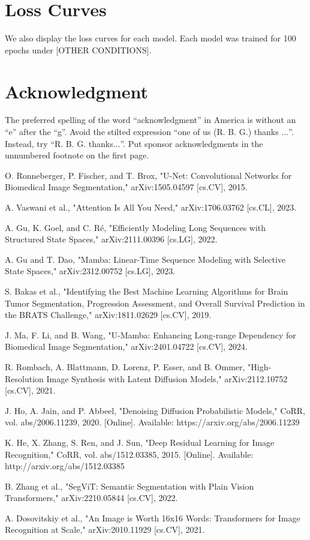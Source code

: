 \documentclass[conference]{IEEEtran}
\begin{document}
\section{Loss Curves}
We also display the loss curves for each model. Each model was trained for 100 epochs under [OTHER CONDITIONS].

\section*{Acknowledgment}

The preferred spelling of the word ``acknowledgment'' in America is without 
an ``e'' after the ``g''. Avoid the stilted expression ``one of us (R. B. 
G.) thanks $\ldots$''. Instead, try ``R. B. G. thanks$\ldots$''. Put sponsor 
acknowledgments in the unnumbered footnote on the first page.

\begin{thebibliography}{00}
 O. Ronneberger, P. Fischer, and T. Brox, "U-Net: Convolutional Networks for Biomedical Image Segmentation," arXiv:1505.04597 [cs.CV], 2015.

 A. Vaswani et al., "Attention Is All You Need," arXiv:1706.03762 [cs.CL], 2023.

 A. Gu, K. Goel, and C. Ré, "Efficiently Modeling Long Sequences with Structured State Spaces," arXiv:2111.00396 [cs.LG], 2022.

 A. Gu and T. Dao, "Mamba: Linear-Time Sequence Modeling with Selective State Spaces," arXiv:2312.00752 [cs.LG], 2023.

 S. Bakas et al., "Identifying the Best Machine Learning Algorithms for Brain Tumor Segmentation, Progression Assessment, and Overall Survival Prediction in the BRATS Challenge," arXiv:1811.02629 [cs.CV], 2019.

 J. Ma, F. Li, and B. Wang, "U-Mamba: Enhancing Long-range Dependency for Biomedical Image Segmentation," arXiv:2401.04722 [cs.CV], 2024.

 R. Rombach, A. Blattmann, D. Lorenz, P. Esser, and B. Ommer, "High-Resolution Image Synthesis with Latent Diffusion Models," arXiv:2112.10752 [cs.CV], 2021.

 J. Ho, A. Jain, and P. Abbeel, "Denoising Diffusion Probabilistic Models," CoRR, vol. abs/2006.11239, 2020. [Online]. Available: https://arxiv.org/abs/2006.11239

 K. He, X. Zhang, S. Ren, and J. Sun, "Deep Residual Learning for Image Recognition," CoRR, vol. abs/1512.03385, 2015. [Online]. Available: http://arxiv.org/abs/1512.03385

 B. Zhang et al., "SegViT: Semantic Segmentation with Plain Vision Transformers," arXiv:2210.05844 [cs.CV], 2022.

 A. Dosovitskiy et al., "An Image is Worth 16x16 Words: Transformers for Image Recognition at Scale," arXiv:2010.11929 [cs.CV], 2021.
\end{thebibliography}
\end{document}
